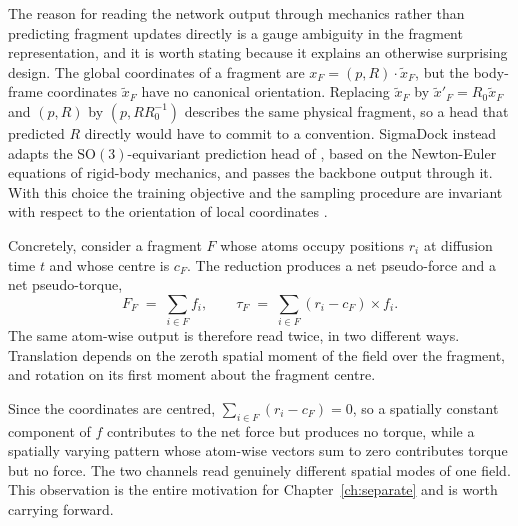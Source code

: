 \documentclass[11pt,a4paper]{report}
\theoremstyle{plain}
\theoremstyle{definition}
\theoremstyle{remark}
\newcommand{\SOthree}{\mathrm{SO}(3)}
\newcommand{\Rot}{R}
\begin{document}
The reason for reading the network output through mechanics rather than
predicting fragment updates directly is a gauge ambiguity in the fragment
representation, and it is worth stating because it explains an otherwise
surprising design. The global coordinates of a fragment are
$x_F = (p,\Rot)\cdot\tilde{x}_F$, but the body-frame coordinates $\tilde{x}_F$
have no canonical orientation. Replacing $\tilde{x}_F$ by
$\tilde{x}'_F = \Rot_0\tilde{x}_F$ and $(p,\Rot)$ by $(p, \Rot\Rot_0^{-1})$
describes the same physical fragment, so a head that predicted $\Rot$ directly
would have to commit to a convention. SigmaDock instead adapts the
$\SOthree$-equivariant prediction head of \citet{jin2023se3denoising}, based on
the Newton-Euler equations of rigid-body mechanics, and passes the backbone
output through it. With this choice the training objective and the sampling
procedure are invariant with respect to the orientation of local coordinates
\citep[Theorem~2]{prat2026sigmadock}.

Concretely, consider a fragment $F$ whose atoms occupy positions $r_i$ at
diffusion time $t$ and whose centre is $c_F$. The reduction produces a net
pseudo-force and a net pseudo-torque,
\begin{equation}
  F_F \;=\; \sum_{i \in F} f_i ,
  \qquad
  \tau_F \;=\; \sum_{i \in F} (r_i - c_F) \times f_i .
  \label{eq:newton-euler}
\end{equation}
The same atom-wise output is therefore read twice, in two different ways.
Translation depends on the zeroth spatial moment of the field over the
fragment, and rotation on its first moment about the fragment centre.

Since the coordinates are centred, $\sum_{i\in F}(r_i - c_F) = 0$, so a
spatially constant component of $f$ contributes to the net force but produces
no torque, while a spatially varying pattern whose atom-wise vectors sum to
zero contributes torque but no force. The two channels read genuinely
different spatial modes of one field. This observation is the entire
motivation for Chapter~\ref{ch:separate} and is worth carrying forward.
\end{document}
